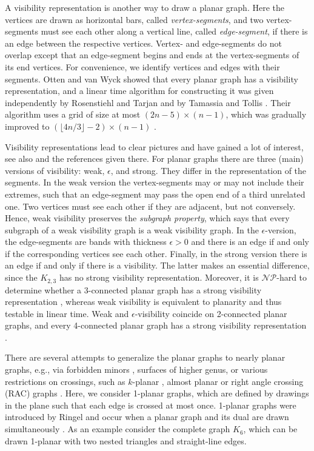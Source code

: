 \documentclass[runningheads]{llncs}
\newcommand{\NP}{\ensuremath{\mathcal{NP}}}
\begin{document}
A visibility representation is another way to draw a planar graph.
Here the vertices are drawn as horizontal bars, called
\emph{vertex-segments}, and two vertex-segments must see each other
along a vertical line, called \emph{edge-segment}, if there is an
edge between the respective vertices. Vertex- and edge-segments do
not overlap except that an edge-segment begins and ends at the
vertex-segments of its end vertices. For convenience, we identify
vertices and edges with their segments. Otten and van Wyck
\cite{ow-grild-78} showed that every planar graph has a visibility
representation, and a linear time algorithm for constructing it was
given independently by Rosenstiehl and Tarjan \cite{rt-rplbopg-86}
and by Tamassia and Tollis \cite{TT-vrpg-86}. Their algorithm uses a
grid of size at most $(2n-5) \times (n-1)$, which was gradually
improved to
 $(\lfloor 4n/3 \rfloor -2)  \times (n-1)$
 \cite{flly-wovrpg-07}.



 Visibility representations lead to clear pictures and have gained a
 lot of interest, see also \cite{dett-gdavg-99} and the references given there.
 For planar
graphs there are  three (main) versions of visibility: weak,
$\epsilon$, and strong.  They differ in the representation of the
segments. In the weak version the  vertex-segments may or may not
include their extremes, such that an edge-segment  may pass the open
end of a third unrelated one. Two vertices must see each other if
they are adjacent, but not conversely. Hence, weak visibility
preserves the \emph{subgraph property}, which says that every
subgraph of a weak visibility graph is a weak visibility graph. In
the $\epsilon$-version, the edge-segments are bands with thickness
$\epsilon
> 0$ and there is an edge if and only if the corresponding vertices
see each other.  Finally, in the strong version there is an edge if
and only if there is a visibility. The latter makes an essential
difference, since the $K_{2,3}$ has no strong visibility
representation. Moreover, it is \NP-hard to determine whether a
3-connected planar graph has a strong visibility representation
\cite{a-rvg-92}, whereas weak visibility is equivalent to planarity
and thus testable in linear time. Weak and $\epsilon$-visibility
coincide on 2-connected planar graphs, and every 4-connected planar
graph has a strong visibility representation \cite{TT-vrpg-86}.

There are several attempts to generalize the planar graphs to nearly
planar graphs, e.g., via forbidden minors \cite{rs-gmV-86}, surfaces
of higher genus, or various restrictions on crossings, such as
$k$-planar \cite{pt-gdfce-97}, almost planar \cite{FPS-nekqpg-13} or
right angle crossing (RAC) graphs \cite{del-dgrac-11}. Here, we
consider 1-planar graphs, which are defined by drawings in the plane
such that each edge is crossed at most once. 1-planar graphs were
introduced by Ringel \cite{ringel-65} and occur when a planar graph
and its dual are drawn simultaneously \cite{ek-sepgd-05}. As an
example consider the complete graph $K_6$, which can be drawn
1-planar with two nested triangles and straight-line edges.
\end{document}
